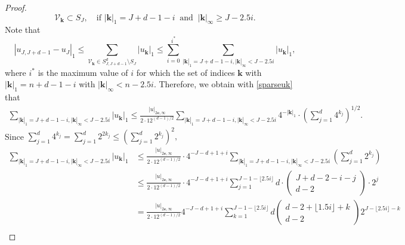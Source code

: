 \begin{proof}
\begin{equation}
\mathcal V_{\mathbf{k}}\subset S_J, \quad \mbox{if } |\mathbf{k}|_{1}=J+d-1-i \ \mbox{ and }\ |\mathbf{k}|_{\infty} \geq J-2.5 i.
\end{equation}
Note that 
$$
\left|u_{J,J+d-1}-u_J\right|_1\leq \sum_{\mathcal V_{\mathbf k} \in S_{J,J+d-1}^d \setminus S_J}\left|u_{\mathbf{k}}\right|_1
\leq \sum_{i=0}^{i^{*}} \sum_{\left.|\mathbf{k}\right|_{1}=J+d-1-i,\left.|\mathbf{k}\right|_{\infty}<J-2.5 i}\left|u_{\mathbf{k}}\right|_1,
$$
where $i^*$ is the maximum value of $i$ for which the set of indices $\mathbf{k}$ with $|\mathbf{k}|_1=n+d-1-i$ with $|\mathbf{k}|_\infty<n-2.5i$. 
Therefore, we obtain with \eqref{sparseuk} that
\begin{equation*}
\begin{aligned}
 \sum_{\left.|\mathbf{k}\right|_{1}=J+d-1-i,\left.|\mathbf{k}\right|_{\infty}<J-2.5 i}\left|u_{\mathbf{k}}\right|_1
 \leq \frac{|u|_{2\mathbf{e},\infty}}{2 \cdot 12^{(d-1) / 2}}  \sum_{\left.|\mathbf{k}\right|_{1}=J+d-1-i,\left.|\mathbf{k}\right|_{\infty}<J-2.5 i} 4^{-|\mathbf{k}|_{1}} \cdot\left(\sum_{j=1}^{d} 4^{k_{j}}\right)^{1 / 2}.
 \end{aligned}
\end{equation*}
Since
$
\displaystyle \sum_{j=1}^{d} 4^{k_{j}}=\sum_{j=1}^{d} 2^{2k_{j}}\leq \left(\sum_{j=1}^{d} 2^{k_{j}}\right)^2,
$
\begin{equation*}
\begin{aligned}
 \sum_{\left.|\mathbf{k}\right|_{1}=J+d-1-i,\left.|\mathbf{k}\right|_{\infty}<J-2.5 i}\left|u_{\mathbf{k}}\right|_1 
&\leq \frac{|u|_{2\mathbf{e},\infty}}{2 \cdot 12^{(d-1) / 2}} \cdot 4^{-J-d+1+i}  \sum_{\left.|\mathbf{k}\right|_{1}=J+d-1-i,\left.|\mathbf{k}\right|_{\infty}<J-2.5 i}\left(\sum_{j=1}^{d} 2^{k_{j}}\right)
\\
&\leq \frac{|u|_{2\mathbf{e},\infty}}{2 \cdot 12^{(d-1) / 2}} \cdot 4^{-J-d+1+i}  \sum_{j=1}^{J-1-\lfloor 2.5 i\rfloor} d \cdot\left(\begin{array}{c}
J+d-2-i-j \\
d-2
\end{array}\right) \cdot 2^{j}
\\
&=\frac{|u|_{2\mathbf{e},\infty}}{2 \cdot 12^{(d-1) / 2}} 4^{-J-d+1+i} \sum_{k=1}^{J-1-\lfloor 2.5 i\rfloor} d\left(\begin{array}{c}
d-2+\lfloor 1.5 i\rfloor+k \\
d-2
\end{array}\right) 2^{J-\lfloor 2.5 i\rfloor-k}
\\

\end{aligned}
\end{equation*}
\end{proof}
